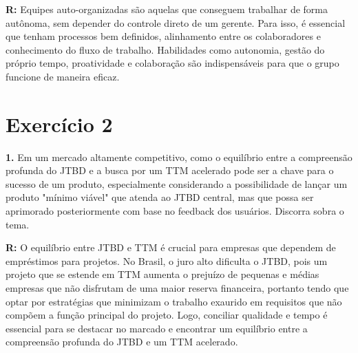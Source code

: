 \documentclass[12pt,a4paper]{article}
\begin{document}
\textbf{R:} Equipes auto-organizadas são aquelas que conseguem trabalhar de forma autônoma,
sem depender do controle direto de um gerente. Para isso, é essencial que tenham processos
bem definidos, alinhamento entre os colaboradores e conhecimento do fluxo de trabalho.
Habilidades como autonomia, gestão do próprio tempo, proatividade e colaboração são
indispensáveis para que o grupo funcione de maneira eficaz.

\section{Exercício 2}

\textbf{1.} Em um mercado altamente competitivo, como o equilíbrio entre a compreensão profunda
do JTBD e a busca por um TTM acelerado pode ser a chave para o sucesso de um produto, especialmente
considerando a possibilidade de lançar um produto "mínimo viável" que atenda ao JTBD central, mas
que possa ser aprimorado posteriormente com base no feedback dos usuários. Discorra sobra o tema. 

\textbf{R:} O equilíbrio entre JTBD e TTM é crucial para empresas que dependem de empréstimos
para projetos. No Brasil, o juro alto dificulta o JTBD, pois um projeto que se estende em TTM
aumenta o prejuízo de pequenas e médias empresas que não disfrutam de uma maior reserva
financeira, portanto tendo que optar por estratégias que minimizam o trabalho exaurido em
requisitos que não compõem a função principal do projeto. Logo, conciliar qualidade e tempo
é essencial para se destacar no marcado e encontrar um equilíbrio entre a compreensão profunda
do JTBD e um TTM acelerado.
\end{document}
